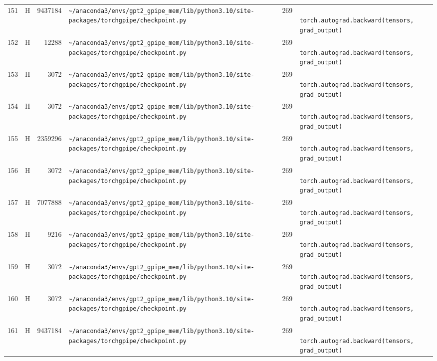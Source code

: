 \documentclass{article}
\begin{document}
\begin{longtable}{r l r p{6.5cm} r p{7.0cm}}
151 & H & 9437184 & \lstinline|~/anaconda3/envs/gpt2_gpipe_mem/lib/python3.10/site-packages/torchgpipe/checkpoint.py| & 269 & \lstinline|            torch.autograd.backward(tensors, grad_output)| \\
152 & H & 12288 & \lstinline|~/anaconda3/envs/gpt2_gpipe_mem/lib/python3.10/site-packages/torchgpipe/checkpoint.py| & 269 & \lstinline|            torch.autograd.backward(tensors, grad_output)| \\
153 & H & 3072 & \lstinline|~/anaconda3/envs/gpt2_gpipe_mem/lib/python3.10/site-packages/torchgpipe/checkpoint.py| & 269 & \lstinline|            torch.autograd.backward(tensors, grad_output)| \\
154 & H & 3072 & \lstinline|~/anaconda3/envs/gpt2_gpipe_mem/lib/python3.10/site-packages/torchgpipe/checkpoint.py| & 269 & \lstinline|            torch.autograd.backward(tensors, grad_output)| \\
155 & H & 2359296 & \lstinline|~/anaconda3/envs/gpt2_gpipe_mem/lib/python3.10/site-packages/torchgpipe/checkpoint.py| & 269 & \lstinline|            torch.autograd.backward(tensors, grad_output)| \\
156 & H & 3072 & \lstinline|~/anaconda3/envs/gpt2_gpipe_mem/lib/python3.10/site-packages/torchgpipe/checkpoint.py| & 269 & \lstinline|            torch.autograd.backward(tensors, grad_output)| \\
157 & H & 7077888 & \lstinline|~/anaconda3/envs/gpt2_gpipe_mem/lib/python3.10/site-packages/torchgpipe/checkpoint.py| & 269 & \lstinline|            torch.autograd.backward(tensors, grad_output)| \\
158 & H & 9216 & \lstinline|~/anaconda3/envs/gpt2_gpipe_mem/lib/python3.10/site-packages/torchgpipe/checkpoint.py| & 269 & \lstinline|            torch.autograd.backward(tensors, grad_output)| \\
159 & H & 3072 & \lstinline|~/anaconda3/envs/gpt2_gpipe_mem/lib/python3.10/site-packages/torchgpipe/checkpoint.py| & 269 & \lstinline|            torch.autograd.backward(tensors, grad_output)| \\
160 & H & 3072 & \lstinline|~/anaconda3/envs/gpt2_gpipe_mem/lib/python3.10/site-packages/torchgpipe/checkpoint.py| & 269 & \lstinline|            torch.autograd.backward(tensors, grad_output)| \\
161 & H & 9437184 & \lstinline|~/anaconda3/envs/gpt2_gpipe_mem/lib/python3.10/site-packages/torchgpipe/checkpoint.py| & 269 & \lstinline|            torch.autograd.backward(tensors, grad_output)| \\

\end{longtable}
\end{document}
